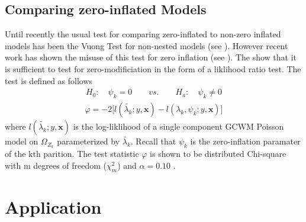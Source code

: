 \documentclass[11pt,letterpaper]{article}
\numberwithin{equation}{section}
\numberwithin{equation}{section}
\numberwithin{equation}{section}
\begin{document}
\subsection{Comparing zero-inflated Models}

Until recently the usual test for comparing zero-inflated to non-zero inflated models has been the Vuong Test for non-nested models (see \cite{vuongTest}). However recent work has shown the misuse of this test for zero inflation (see \cite{misuse}). The \cite{newIntuitive} show that it is sufficient to test for zero-modificiation in the form of a liklihood ratio test. The test is defined as follows
\begin{align*}
& & H_0: \quad \psi_k = 0 \quad\quad vs. \quad\quad H_a: \quad \psi_k \neq 0  & & 
\end{align*}
\begin{align*}
\varphi = -2 \bigg[l(\tilde{\lambda_k}; y, \bm{x}) - l(\lambda_k, \psi_k; y , \bm{x} )\bigg] 
\end{align*}
where $l(\tilde{\lambda_k}; y , \bm{x})$ is the log-liklihood of a single component GCWM Poisson model on $\Omega_{Z_k}$ parameterized by $\tilde{\lambda_k}$. Recall that $\psi_k$ is the zero-inflation paramater of the kth parition. The test statistic $\varphi$ is shown to be distributed Chi-square with m degrees of freedom ($\chi^2_m $) and $\alpha = 0.10$ \citep{newIntuitive}.   

\section{Application}
\end{document}

